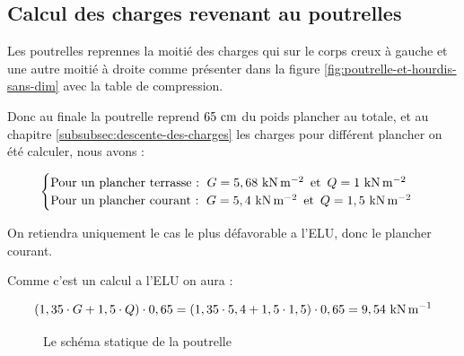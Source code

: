 \subsection{Calcul des charges revenant au poutrelles}

Les poutrelles reprennes la moitié des charges qui sur le corps creux à gauche et une autre moitié à droite comme présenter dans la figure \ref{fig:poutrelle-et-hourdis-sans-dim} avec la table de compression.

\vspace{\baselineskip}

Donc au finale la poutrelle reprend $65\cml$ du poids plancher au totale, et au chapitre \ref{subsubsec:descente-des-charges} les charges pour différent plancher on été calculer, nous avons :

\[ \begin{cases}
	\text{Pour un plancher terrasse : }\, G = 5,68\knms \, \text{ et }\, Q = 1\knms \\
	\text{Pour un plancher courant : }\, G = 5,4\knms \, \text{ et }\, Q = 1,5\knms
\end{cases} \]

On retiendra uniquement le cas le plus défavorable a l'ELU, donc le plancher courant. 

Comme c'est un calcul a l'ELU on aura :

\[ (1,35 \cdot G + 1,5 \cdot Q) \cdot 0,65 = (1,35 \cdot 5,4 + 1,5 \cdot 1,5) \cdot 0,65 = 9,54\knm \]


\begin{figure}[H]
	\centering
	
	\caption{Le schéma statique de la poutrelle}
	\label{fig:schema-poutrelle}
\end{figure}



